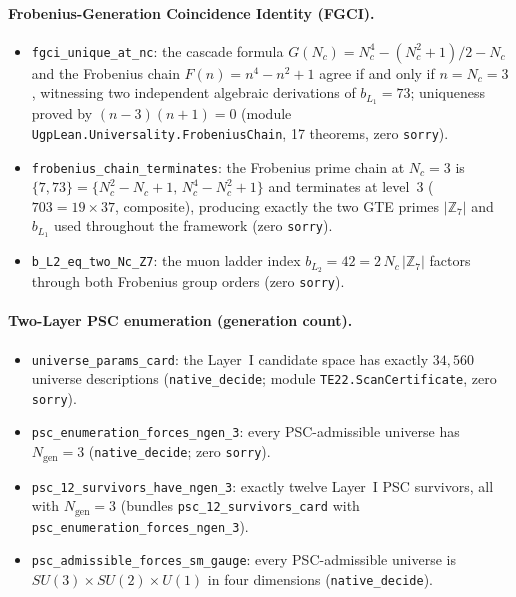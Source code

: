 \documentclass[11pt]{article}
\theoremstyle{remark}
\begin{document}
\begin{appendices}
\paragraph{Frobenius-Generation Coincidence Identity (FGCI).}
\begin{itemize}[leftmargin=1.2em,itemsep=0.1em,topsep=0.2em]
  \item \texttt{fgci\_unique\_at\_nc}: the cascade formula $G(N_c) = N_c^4 - (N_c^2{+}1)/2 - N_c$ and the Frobenius chain $F(n) = n^4 - n^2 + 1$ agree if and only if $n = N_c = 3$, witnessing two independent algebraic derivations of $b_{L_1} = 73$; uniqueness proved by $(n-3)(n+1)=0$ (module \texttt{UgpLean.Universality.FrobeniusChain}, 17 theorems, zero \texttt{sorry}).
  \item \texttt{frobenius\_chain\_terminates}: the Frobenius prime chain at $N_c=3$ is $\{7, 73\} = \{N_c^2{-}N_c{+}1,\, N_c^4{-}N_c^2{+}1\}$ and terminates at level~3 ($703 = 19 \times 37$, composite), producing exactly the two GTE primes $|\mathbb{Z}_7|$ and $b_{L_1}$ used throughout the framework (zero \texttt{sorry}).
  \item \texttt{b\_L2\_eq\_two\_Nc\_Z7}: the muon ladder index $b_{L_2} = 42 = 2\,N_c\,|\mathbb{Z}_7|$ factors through both Frobenius group orders (zero \texttt{sorry}).
\end{itemize}

\paragraph{Two-Layer PSC enumeration (generation count).}
\begin{itemize}[leftmargin=1.2em,itemsep=0.1em,topsep=0.2em]
  \item \texttt{universe\_params\_card}: the Layer~I candidate space has exactly $34{,}560$ universe descriptions (\texttt{native\_decide}; module \texttt{TE22.ScanCertificate}, zero \texttt{sorry}).
  \item \texttt{psc\_enumeration\_forces\_ngen\_3}: every PSC-admissible universe has $N_{\mathrm{gen}} = 3$ (\texttt{native\_decide}; zero \texttt{sorry}).
  \item \texttt{psc\allowbreak\_12\allowbreak\_survivors\allowbreak\_have\allowbreak\_ngen\allowbreak\_3}: exactly twelve Layer~I PSC survivors, all with $N_{\mathrm{gen}} = 3$ (bundles \texttt{psc\allowbreak\_12\allowbreak\_survivors\allowbreak\_card} with \texttt{psc\allowbreak\_enumeration\allowbreak\_forces\allowbreak\_ngen\allowbreak\_3}).
  \item \texttt{psc\_admissible\_forces\_sm\_gauge}: every PSC-admissible universe is $SU(3) \times SU(2) \times U(1)$ in four dimensions (\texttt{native\_decide}).
\end{itemize}



\end{appendices}
\end{document}

